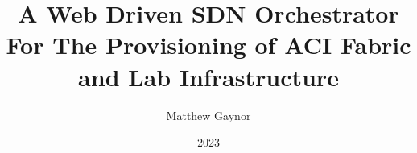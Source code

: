 \documentclass[bsc]{abdnthesis}
\title{A Web Driven SDN Orchestrator For The Provisioning of ACI Fabric and Lab
  Infrastructure}
\author{Matthew Gaynor}
\date{2023}
\begin{document}

\maketitle
\makedeclaration









\newcommand{\autorefp}[1]{\autoref{#1} (p\pageref*{#1})}

\newcommand{\autorefnp}[1]{\autoref{#1} ``\nameref{#1}'', (p\pageref*{#1})}

\newcommand{\see}[1]{\hyperref[#1]{(see \autoref*{#1}, p\pageref*{#1})}}

\newcommand{\seenamed}[1]{\hyperref[#1]{(see \autoref*{#1} ``\nameref*{#1}'',
    p.\pageref*{#1})}}

\newcommand{\bq}[2][]{\singlespacing \begin{quote}
    \begin{small} ``\textit{#2}'' \end{small} #1 \end{quote} \doublespacing}

\newcommand{\qq}[1]{{\enquote{\textit{#1}}}}


\tableofcontents
\listoftables
\listoffigures




\newpage
{}
{}
\printbibliography
\end{document}
